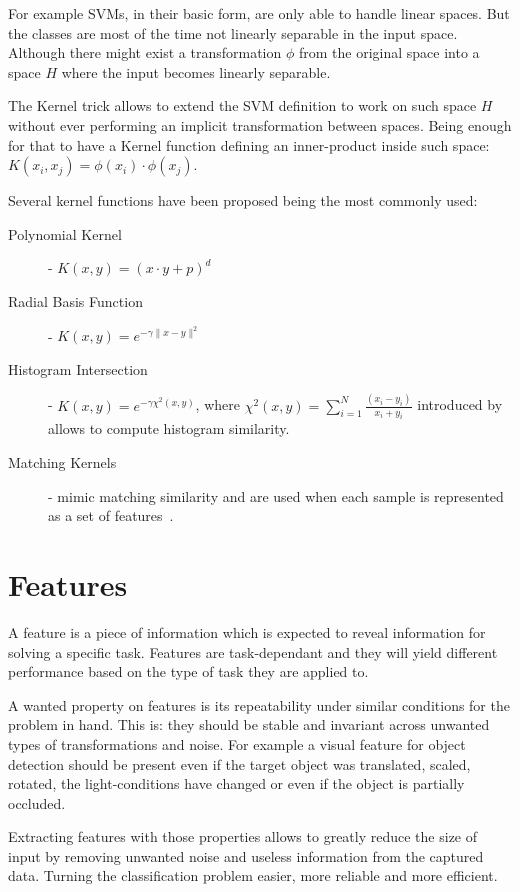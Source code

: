 For example \glspl{SVM}, in their basic form, are only able to handle linear spaces.
But the classes are most of the time not linearly separable in the input
space. Although there might exist a transformation $\phi$ from the original
space into a space $H$ where the input becomes linearly separable.

The Kernel trick allows to extend the \gls{SVM} definition to work on such space
$H$ without ever performing an implicit transformation between spaces. Being
enough for that to have a Kernel function defining an inner-product inside such
space: $K(x_i, x_j) = \phi(x_i)\cdot\phi(x_j)$.

Several kernel functions have been proposed being the most commonly used:

\begin{description}
\item[Polynomial Kernel] - $K(x, y) = (x \cdot y + p)^d$
\item[Radial Basis Function] - $K(x, y) = e^{-\gamma\|x - y \|^2}$
\item[Histogram Intersection] - $K(x, y) = e^{-\gamma \chi^2(x,y)}$, where
$\chi^2(x,y) = \sum_{i=1}^{N}\frac{(x_i-y_i)}{x_i+y_i}$ introduced by
\cite{barla2003histogram} allows to compute histogram similarity.
\item[Matching Kernels] - mimic matching similarity and are used when each
sample is represented as a set of features~\citep{boughorbel2005intermediate}.
\end{description}


\section{Features}
A feature is a piece of information which is expected to reveal information for
solving a specific task. Features are task-dependant and they will
yield different performance based on the type of task they are applied to.

A wanted property on features is its repeatability under similar conditions for
the problem in hand. This is: they should be stable and invariant across
unwanted types of transformations and noise. For example a visual feature for
object detection should be present even if the target object was translated,
scaled, rotated, the light-conditions have changed or even if the object is
partially occluded.

Extracting features with those properties allows to greatly reduce the size of
input by removing unwanted noise and useless information from the captured data.
Turning the classification problem easier, more reliable and more efficient.

